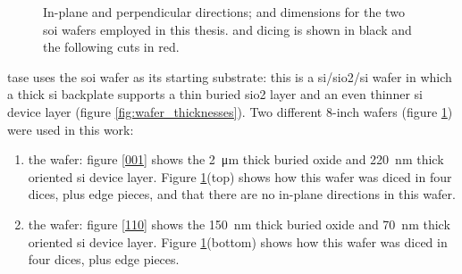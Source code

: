 \begin{figure}
    \caption[In-plane and perpendicular directions; and dimensions for the two \acs{soi} wafers employed in this thesis.]{In-plane and perpendicular directions; and dimensions for the two \acs{soi} wafers employed in this thesis.  and  dicing is shown in black and the following  cuts in red.}
    \label{fig:8in_wafers}
\end{figure}

\Acs{tase} uses the \acs{soi} wafer as its starting substrate: this is a \acs{si}/\acs{sio2}/\acs{si} wafer in which a thick \acl{si} backplate supports a thin buried \acl{sio2} layer and an even thinner \acl{si} device layer (figure \ref{fig:wafer_thicknesses}). Two different 8-inch wafers (figure \ref{fig:8in_wafers}) were used in this work:
\begin{enumerate}
    \item the  wafer: figure \ref{001} shows the \qty{2}{\um} thick buried oxide and \qty{220}{\nm} thick  oriented \acl{si} device layer. Figure \ref{fig:8in_wafers}(top) shows how this wafer was diced in four  dices, plus edge pieces, and that there are no in-plane  directions in this wafer.
    \item the  wafer: figure \ref{110} shows the \qty{150}{\nm} thick buried oxide and \qty{70}{\nm} thick  oriented \acl{si} device layer. Figure \ref{fig:8in_wafers}(bottom) shows how this wafer was diced in four  dices, plus edge pieces.
\end{enumerate}

